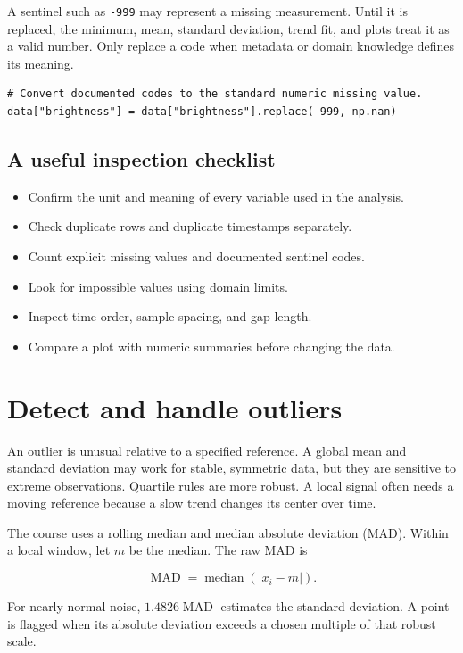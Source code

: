 \documentclass[11pt,letterpaper]{article}
\begin{document}
A sentinel such as \texttt{-999} may represent a missing measurement. Until it
is replaced, the minimum, mean, standard deviation, trend fit, and plots treat
it as a valid number. Only replace a code when metadata or domain knowledge
defines its meaning.

\begin{lstlisting}
# Convert documented codes to the standard numeric missing value.
data["brightness"] = data["brightness"].replace(-999, np.nan)
\end{lstlisting}

\subsection{A useful inspection checklist}

\begin{itemize}
\item Confirm the unit and meaning of every variable used in the analysis.
\item Check duplicate rows and duplicate timestamps separately.
\item Count explicit missing values and documented sentinel codes.
\item Look for impossible values using domain limits.
\item Inspect time order, sample spacing, and gap length.
\item Compare a plot with numeric summaries before changing the data.
\end{itemize}

\section{Detect and handle outliers}

An outlier is unusual relative to a specified reference. A global mean and
standard deviation may work for stable, symmetric data, but they are sensitive
to extreme observations. Quartile rules are more robust. A local signal often
needs a moving reference because a slow trend changes its center over time.

The course uses a rolling median and median absolute deviation (MAD). Within a
local window, let $m$ be the median. The raw MAD is

\[
  \operatorname{MAD} = \operatorname{median}(|x_i-m|).
\]

For nearly normal noise, $1.4826\operatorname{MAD}$ estimates the standard
deviation. A point is flagged when its absolute deviation exceeds a chosen
multiple of that robust scale.
\end{document}
